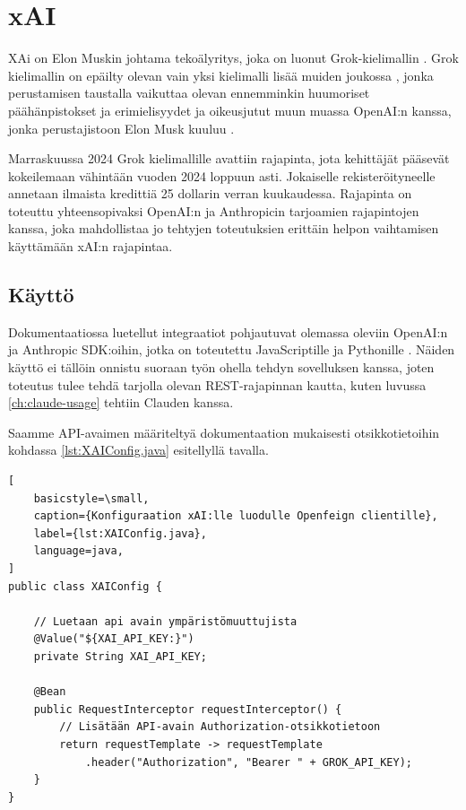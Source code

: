 \section{xAI}

XAi on Elon Muskin johtama tekoälyritys, joka on luonut Grok-kielimallin
\parencite{xAIAbout}. Grok kielimallin on epäilty olevan vain yksi kielimalli
lisää muiden joukossa \parencite{fireshipElonsGrokAI}, jonka perustamisen
taustalla vaikuttaa olevan ennemminkin huumoriset päähänpistokset
\parencite{twitter1679182035645235200} ja erimielisyydet ja oikeusjutut
muun muassa OpenAI:n kanssa, jonka perustajistoon Elon Musk kuuluu
\parencite{fireshipElonsLawsuitAgainstOpenAI}.

Marraskuussa 2024 Grok kielimallille avattiin rajapinta, jota kehittäjät
pääsevät kokeilemaan vähintään vuoden 2024 loppuun asti. Jokaiselle
rekisteröityneelle annetaan ilmaista kredittiä 25 dollarin verran
kuukaudessa. Rajapinta on toteuttu yhteensopivaksi OpenAI:n ja Anthropicin
tarjoamien rajapintojen kanssa, joka mahdollistaa jo tehtyjen toteutuksien
erittäin helpon vaihtamisen käyttämään xAI:n rajapintaa. \parencite{xAIBlogApi}

\subsection{Käyttö}

Dokumentaatiossa luetellut integraatiot pohjautuvat olemassa oleviin OpenAI:n
ja Anthropic SDK:oihin, jotka on toteutettu JavaScriptille ja Pythonille
\parencite{xAIDocsIntegrations}. Näiden käyttö ei tällöin onnistu suoraan
työn ohella tehdyn sovelluksen kanssa, joten toteutus tulee tehdä tarjolla
olevan REST-rajapinnan kautta, kuten luvussa \ref{ch:claude-usage} tehtiin
Clauden kanssa.

Saamme API-avaimen määriteltyä dokumentaation mukaisesti otsikkotietoihin
kohdassa \ref{lst:XAIConfig.java} esitellyllä tavalla.

\begin{lstlisting}[
    basicstyle=\small,
    caption={Konfiguraation xAI:lle luodulle Openfeign clientille},
    label={lst:XAIConfig.java},
    language=java,
]
public class XAIConfig {

    // Luetaan api avain ympäristömuuttujista
    @Value("${XAI_API_KEY:}")
    private String XAI_API_KEY;

    @Bean
    public RequestInterceptor requestInterceptor() {
        // Lisätään API-avain Authorization-otsikkotietoon
        return requestTemplate -> requestTemplate
            .header("Authorization", "Bearer " + GROK_API_KEY);
    }
}
\end{lstlisting}

